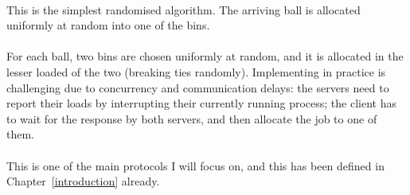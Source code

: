 \paragraph{\OneChoice}

This is the simplest randomised algorithm. The arriving ball is allocated uniformly at random into one of the bins.

\paragraph{\TwoChoice}
For each ball, two bins are chosen uniformly at random, and it is allocated in the lesser loaded of the two (breaking ties randomly). Implementing \TwoChoice in practice is challenging due to concurrency and communication delays: the servers need to report their loads by interrupting their currently running process; the client has to wait for the response by both servers, and then allocate the job to one of them.

\paragraph{\TwoThinning}

This is one of the main protocols I will focus on, and this has been defined in Chapter~\ref{introduction} already.

